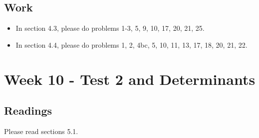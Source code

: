 	\subsection{Work}
		\begin{itemize}
			\item In section 4.3, please do problems 1-3, 5, 9, 10, 17, 20, 21, 25.
			\item In section 4.4, please do problems 1, 2, 4bc, 5, 10, 11, 13, 17, 18, 20, 21, 22.
		\end{itemize}

	\clearpage



	\section{Week 10 - Test 2 and Determinants}

	\subsection{Readings}
		Please read sections 5.1.


